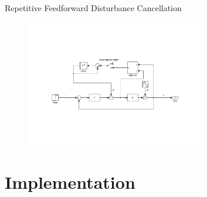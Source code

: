 \documentclass[10pt]{beamer}
\begin{document}
\begin{frame}{Repetitive Feedforward Disturbance Cancellation}
  \begin{figure}[h]
    \centering %
    \includegraphics[width=0.7\textwidth, trim=6cm 5.5cm 5.2cm 5.5cm, clip=true]{../fig/matlab/ffrep}
  \end{figure}
  \vspace{-1cm}
  \begin{figure}[h!]
    \centering
  \end{figure}
\end{frame}

\section{Implementation}
\end{document}
